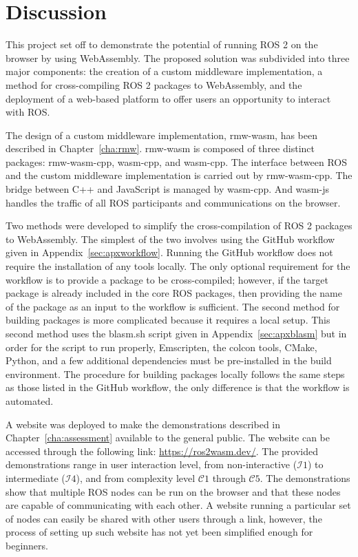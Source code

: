 \chapter{Discussion}

This project set off to demonstrate the potential of running \ac{ROS} 2 on the browser by using WebAssembly. The proposed solution was subdivided into three major components: the creation of a custom middleware implementation, a method for cross-compiling \ac{ROS} 2 packages to WebAssembly, and the deployment of a web-based platform to offer users an opportunity to interact with \ac{ROS}.

The design of a custom middleware implementation, \textsf{rmw-wasm}, has been described in Chapter~\ref{cha:rmw}. \textsf{rmw-wasm} is composed of three distinct packages: \textsf{rmw-wasm-cpp}, \textsf{wasm-cpp}, and \textsf{wasm-cpp}. The interface between \ac{ROS} and the custom middleware implementation is carried out by \textsf{rmw-wasm-cpp}. The bridge between C++ and JavaScript is managed by \textsf{wasm-cpp}. And \textsf{wasm-js} handles the traffic of all \ac{ROS} participants and communications on the browser.

Two methods were developed to simplify the cross-compilation of \ac{ROS} 2 packages to WebAssembly. The simplest of the two involves using the GitHub workflow given in Appendix~\ref{sec:apxworkflow}. Running the GitHub workflow does not require the installation of any tools locally. The only optional requirement for the workflow is to provide a package to be cross-compiled; however, if the target package is already included in the core \ac{ROS} packages, then providing the name of the package as an input to the workflow is sufficient. The second method for building packages is more complicated because it requires a local setup. This second method uses the \textsf{blasm.sh} script given in Appendix~\ref{sec:apxblasm} but in order for the script to run properly, Emscripten, the \textsf{colcon} tools, CMake, Python, and a few additional dependencies must be pre-installed in the build environment. The procedure for building packages locally follows the same steps as those listed in the GitHub workflow, the only difference is that the workflow is automated.

A website was deployed to make the demonstrations described in Chapter~\ref{cha:assessment} available to the general public. The website can be accessed through the following link: \href{https://ros2wasm.dev/}{https://ros2wasm.dev/}. The provided demonstrations range in user interaction level, from non-interactive ($\mathcal{I}1$) to intermediate ($\mathcal{I}4$), and from complexity level $\mathcal{C}1$ through $\mathcal{C}5$. The demonstrations show that multiple \ac{ROS} nodes can be run on the browser and that these nodes are capable of communicating with each other. A website running a particular set of nodes can easily be shared with other users through a link, however, the process of setting up such website has not yet been simplified enough for beginners. 

